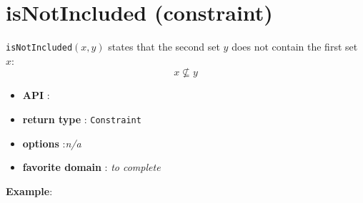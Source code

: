 \label{isnotincluded}
\hypertarget{isnotincluded}{}

\section{isNotIncluded (constraint)}\label{isnotincluded:isnotincludedconstraint}\hypertarget{isnotincluded:isnotincludedconstraint}{}
\begin{notedef}
  \texttt{isNotIncluded}$(x,y)$ states that the second set $y$ does not contain the first set $x$:
 $$x\not\subseteq y$$
\end{notedef}

\begin{itemize}
	\item \textbf{API} : 
	\item \textbf{return type} : \texttt{Constraint}
	\item \textbf{options} :\emph{n/a}
	\item \textbf{favorite domain} : \emph{to complete}
\end{itemize}

\textbf{Example}:
 
